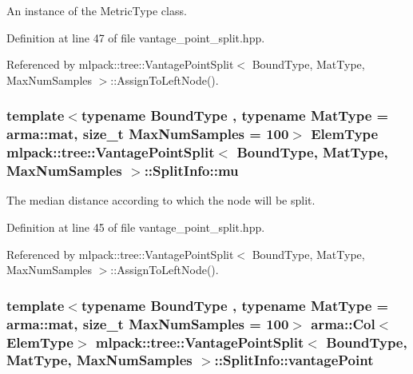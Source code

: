 An instance of the Metric\+Type class. 



Definition at line 47 of file vantage\+\_\+point\+\_\+split.\+hpp.



Referenced by mlpack\+::tree\+::\+Vantage\+Point\+Split$<$ Bound\+Type, Mat\+Type, Max\+Num\+Samples $>$\+::\+Assign\+To\+Left\+Node().

\subsubsection[{mu}]{\setlength{\rightskip}{0pt plus 5cm}template$<$typename Bound\+Type , typename Mat\+Type  = arma\+::mat, size\+\_\+t Max\+Num\+Samples = 100$>$ {\bf Elem\+Type} {\bf mlpack\+::tree\+::\+Vantage\+Point\+Split}$<$ Bound\+Type, Mat\+Type, Max\+Num\+Samples $>$\+::Split\+Info\+::mu}\label{structmlpack_1_1tree_1_1VantagePointSplit_1_1SplitInfo_a63001de625339c0797165eaed6eb54af}


The median distance according to which the node will be split. 



Definition at line 45 of file vantage\+\_\+point\+\_\+split.\+hpp.



Referenced by mlpack\+::tree\+::\+Vantage\+Point\+Split$<$ Bound\+Type, Mat\+Type, Max\+Num\+Samples $>$\+::\+Assign\+To\+Left\+Node().

\subsubsection[{vantage\+Point}]{\setlength{\rightskip}{0pt plus 5cm}template$<$typename Bound\+Type , typename Mat\+Type  = arma\+::mat, size\+\_\+t Max\+Num\+Samples = 100$>$ arma\+::\+Col$<${\bf Elem\+Type}$>$ {\bf mlpack\+::tree\+::\+Vantage\+Point\+Split}$<$ Bound\+Type, Mat\+Type, Max\+Num\+Samples $>$\+::Split\+Info\+::vantage\+Point}\label{structmlpack_1_1tree_1_1VantagePointSplit_1_1SplitInfo_a06d7fda7b3bf4570da3699e58dd77a67}


